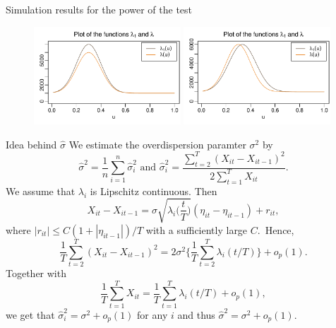 \documentclass[10pt, handout]{beamer}
\begin{document}
\begin{frame}{Simulation results for the power of the test}
\begin{figure}[t!]
	\includegraphics[width = 0.49\textwidth, height = 0.4\textheight]{plots/lambda_fcts_height}
	\onslide<2->\includegraphics[width = 0.49\textwidth, height = 0.4\textheight]{plots/lambda_fcts_shift}	
\end{figure}\pause
\vspace{-5mm}
{\scriptsize{\begin{table}[t]
\begin{center}
\caption{Power of the multiscale test for scenario A}
\label{tab:size_shape}

\end{center}
\end{table}}}
{
\vspace{-39.5mm}
\scriptsize{\begin{table}[t]
\begin{center}
\caption{Power of the multiscale test for scenario B}
\label{tab:size_shape}

\end{center}
\end{table}}}
\end{frame}

\begin{frame}[label = frame_sigma]{Idea behind $\hat{\sigma}$}
We estimate the overdispersion paramter $\sigma^2$ by \[\widehat{\sigma}^2= \frac{1}{n} \sum_{i = 1}^n \hat{\sigma}_i^2 \text{ and } \hat{\sigma}_i^2 = \frac{\sum_{t=2}^T (X_{it}-X_{it-1})^2}{2 \sum_{t=1}^T X_{it}}.\] \pause
We assume that $\lambda_i$ is Lipschitz continuous. Then
\[ X_{it} - X_{it-1} = \sigma \sqrt{\lambda_i\Big(\frac{t}{T}\Big)} (\eta_{it} - \eta_{it-1}) + r_{it}, \]
where $|r_{it}| \le C(1+|\eta_{it-1}|)/T$ with a sufficiently large $C$.\pause \, Hence,
\[ \frac{1}{T} \sum_{t=2}^T (X_{it} - X_{it-1})^2 = 2 \sigma^2 \Big\{ \frac{1}{T} \sum_{t=2}^T \lambda_i(t/T) \Big\} + o_p(1).\] \pause
Together with \[ \frac{1}{T} \sum_{t=1}^T X_{it} = \frac{1}{T} \sum_{t=1}^T \lambda_i(t/T) + o_p(1), \] we get that $\hat{\sigma}_i^2 = \sigma^2 + o_p(1)$ for any $i$ and thus $\hat{\sigma}^2 = \sigma^2 + o_p(1)$. \hyperlink{frame_teststatistic<4>}{}
\end{frame}
\end{document}
